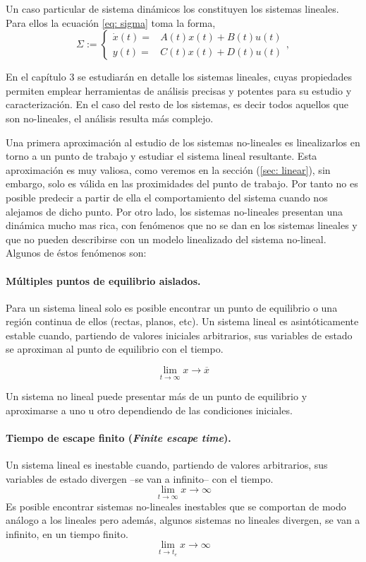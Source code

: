 Un caso particular de sistema dinámicos los constituyen los sistemas lineales. Para ellos la ecuación \ref{eq: sigma} toma la forma,
\begin{equation}
	\Sigma := \begin{cases}
		\dot x(t) =& A(t)x(t)+B(t)u(t) \\ y(t) =& C(t)x(t)+D(t)u(t)
	\end{cases}, 
\label{eq: sigmaL}
\end{equation}

En el capítulo 3 se estudiarán en detalle los sistemas lineales, cuyas propiedades permiten emplear herramientas de análisis precisas y potentes para su estudio y caracterización. En el caso del resto de los sistemas, es decir todos aquellos que son no-lineales, el análisis resulta más complejo.

Una primera aproximación al estudio de los sistemas no-lineales es linealizarlos en torno a un punto de trabajo y estudiar el sistema lineal resultante. Esta aproximación es muy valiosa, como  veremos en la sección (\ref{sec: linear}), sin embargo, solo es válida en las proximidades del punto de trabajo. Por tanto no es posible predecir a partir de ella el comportamiento del sistema cuando nos alejamos de dicho punto. Por otro lado, los sistemas no-lineales presentan una dinámica mucho mas rica, con fenómenos que no se dan en los sistemas lineales y que no pueden describirse con un modelo linealizado del sistema no-lineal. Algunos de éstos fenómenos son:

\paragraph{Múltiples puntos de equilibrio aislados.} Para un sistema lineal solo es posible encontrar un punto de equilibrio o una región continua de ellos (rectas, planos, etc).  Un sistema lineal es asintóticamente estable cuando, partiendo de valores iniciales arbitrarios, sus variables de estado se aproximan al punto de equilibrio con el tiempo. 

\begin{equation}
\lim_{ t \to \infty} x \to \overline x
\end{equation}


Un sistema no lineal puede presentar más de un punto de equilibrio y aproximarse a uno u otro dependiendo de las condiciones iniciales.

\paragraph{Tiempo de escape finito (\emph{Finite escape time}).} Un sistema lineal es inestable cuando, partiendo de valores arbitrarios, sus variables de estado divergen --se van a infinito-- con el tiempo.
\begin{equation}
\lim_{ t \to \infty} x \to \infty
\end{equation}
Es posible encontrar sistemas no-lineales inestables que se comportan de modo análogo a los lineales pero además, algunos sistemas no lineales divergen, se van a infinito, en un tiempo finito. 
\begin{equation}
\lim_{ t \to t_e} x \to \infty
\end{equation}


